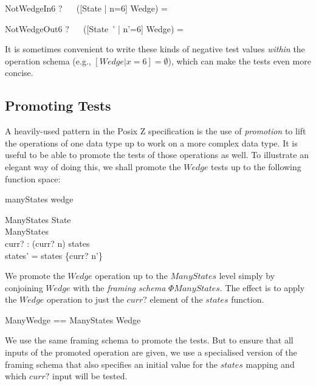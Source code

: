 \documentclass{llncs}
\begin{document}
\begin{theorem}{NotWedgeIn6}
\vdash? ~~ ([State | n=6] \land Wedge) = \emptyset
\end{theorem}

\begin{theorem}{NotWedgeOut6}
\vdash? ~~ ([State~' | n'=6] \land Wedge) = \emptyset
\end{theorem}

It is sometimes convenient to write these kinds of negative test values
\emph{within} the operation schema (e.g., $[Wedge | x=6] = \emptyset$),
which can make the tests even more concise.


\subsection{Promoting Tests}

A heavily-used pattern in the Posix Z specification is the use of
\emph{promotion} to lift the operations of one data type up to work on a
more complex data type.  It is useful to be able to promote the tests
of those operations as well.  To illustrate an elegant way of doing this,
we shall promote the $Wedge$ tests up to the following function space:

\begin{zsection}
  \SECTION manyStates \parents wedge
\end{zsection}


\begin{schema}{\Phi ManyStates}
  \Delta State \\
  \Delta ManyStates \\
  curr? : \nat
\where
  (curr? \mapsto n) \in states \\
  states' = states \oplus \{curr? \mapsto n'\}
\end{schema}

We promote the $Wedge$ operation up to the $ManyStates$ level simply by
conjoining $Wedge$ with the \emph{framing schema} $\Phi ManyStates$.
The effect is to apply the $Wedge$ operation to just the $curr?$ element of
the $states$ function. 

\begin{zed}
  ManyWedge == \Phi ManyStates \land Wedge
\end{zed}


We use the same framing schema to promote the tests.  But to ensure that
all inputs of the promoted operation are given, we use a specialised
version of the framing schema that also specifies an initial value
for the $states$ mapping and which $curr?$ input will be tested.
\end{document}
